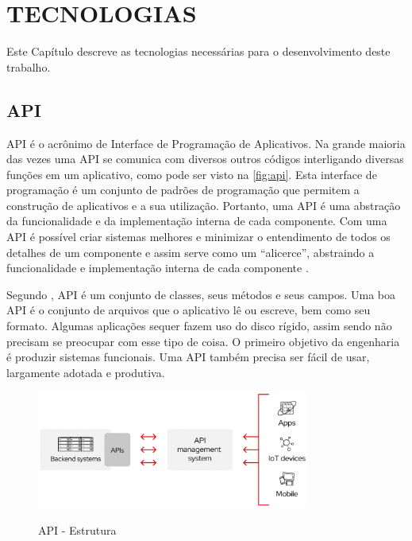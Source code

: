 
\chapter{TECNOLOGIAS}

Este Capítulo descreve as tecnologias necessárias para o desenvolvimento deste trabalho.

\section{API}
API é o acrônimo de Interface de Programação de Aplicativos. Na grande maioria das vezes uma API se comunica com diversos outros códigos interligando diversas funções em um aplicativo, como pode ser visto na \autoref{fig:api}. Esta interface de programação é um conjunto de padrões de programação que permitem a construção de aplicativos e a sua utilização. Portanto, uma API é uma abstração da funcionalidade e da implementação interna de cada componente. Com uma API é possível criar sistemas melhores e minimizar o entendimento de todos os detalhes de um componente e assim serve como um “alicerce”, abstraindo a funcionalidade e implementação interna de cada componente \cite{jaroslavapi}.

Segundo , API é um conjunto de classes, seus métodos e seus campos.
Uma boa API é o conjunto de arquivos que o aplicativo lê ou escreve, bem como seu formato. Algumas aplicações sequer fazem uso do disco rígido, assim sendo não precisam se preocupar com esse tipo de coisa. O primeiro objetivo da engenharia é produzir sistemas funcionais. Uma API também precisa ser fácil de usar, largamente adotada e produtiva.

\begin{figure}[H]
    \centering
    \caption{API -  Estrutura}
    \includegraphics[width=0.8\textwidth]{./dados/figuras/fig10}
    \label{fig:api}
\end{figure}

